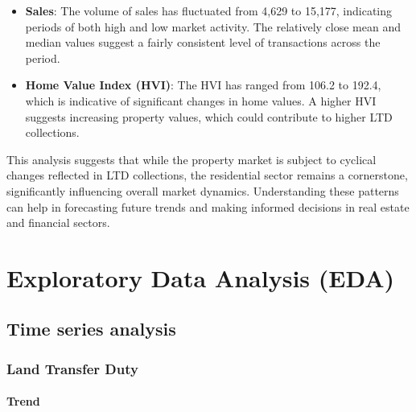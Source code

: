 \documentclass[11pt,a4paper,]{article}
\providecommand{\tightlist}{%
  \setlength{\itemsep}{0pt}\setlength{\parskip}{0pt}}
\begin{document}
\begin{enumerate}
  \begin{itemize}
  \tightlist
  \item
    \textbf{Sales}: The volume of sales has fluctuated from 4,629 to 15,177, indicating periods of both high and low market activity. The relatively close mean and median values suggest a fairly consistent level of transactions across the period.
  \item
    \textbf{Home Value Index (HVI)}: The HVI has ranged from 106.2 to 192.4, which is indicative of significant changes in home values. A higher HVI suggests increasing property values, which could contribute to higher LTD collections.
  \end{itemize}
\end{enumerate}

This analysis suggests that while the property market is subject to cyclical changes reflected in LTD collections, the residential sector remains a cornerstone, significantly influencing overall market dynamics. Understanding these patterns can help in forecasting future trends and making informed decisions in real estate and financial sectors.

\section{Exploratory Data Analysis (EDA)}\label{exploratory-data-analysis-eda}

\subsection{Time series analysis}\label{time-series-analysis}

\subsubsection{Land Transfer Duty}\label{land-transfer-duty}

\paragraph{Trend}\label{trend}
\end{document}
